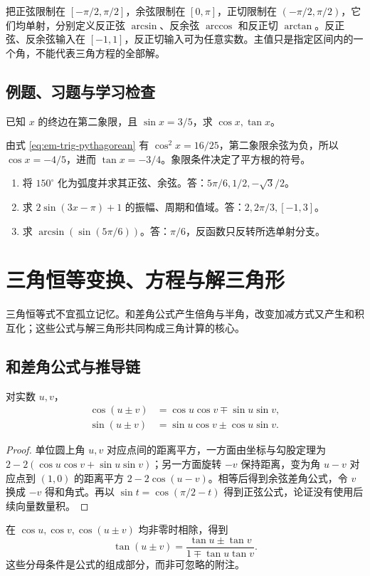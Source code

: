 \documentclass[UTF8]{ctexbook}
\begin{document}
把正弦限制在 $[-\pi/2,\pi/2]$，余弦限制在 $[0,\pi]$，正切限制在 $(-\pi/2,\pi/2)$，它们均单射，分别定义反正弦 $\arcsin$、反余弦 $\arccos$ 和反正切 $\arctan$。反正弦、反余弦输入在 $[-1,1]$，反正切输入可为任意实数。主值只是指定区间内的一个角，不能代表三角方程的全部解。

\section{例题、习题与学习检查}
\begin{example}
已知 $x$ 的终边在第二象限，且 $\sin x=3/5$，求 $\cos x,\tan x$。
\end{example}
\begin{solve}
由式 \eqref{eq:em-trig-pythagorean} 有 $\cos^2x=16/25$，第二象限余弦为负，所以 $\cos x=-4/5$，进而 $\tan x=-3/4$。象限条件决定了平方根的符号。
\end{solve}
\begin{enumerate}
\item 将 $150^\circ$ 化为弧度并求其正弦、余弦。答：$5\pi/6,1/2,-\sqrt3/2$。
\item 求 $2\sin(3x-\pi)+1$ 的振幅、周期和值域。答：$2,2\pi/3,[-1,3]$。
\item 求 $\arcsin(\sin(5\pi/6))$。答：$\pi/6$，反函数只反转所选单射分支。
\end{enumerate}

\chapter{三角恒等变换、方程与解三角形}
\label{chap:em-triangle-solving}
三角恒等式不宜孤立记忆。和差角公式产生倍角与半角，改变加减方式又产生和积互化；这些公式与解三角形共同构成三角计算的核心。

\section{和差角公式与推导链}
\begin{theorem}[和差角公式]
对实数 $u,v$，
\begin{align}
 \cos(u\pm v)&=\cos u\cos v\mp\sin u\sin v,\label{eq:em-cos-add}\\
 \sin(u\pm v)&=\sin u\cos v\pm\cos u\sin v.\label{eq:em-sin-add}
\end{align}
\end{theorem}
\begin{proof}
单位圆上角 $u,v$ 对应点间的距离平方，一方面由坐标与勾股定理为 $2-2(\cos u\cos v+\sin u\sin v)$；另一方面旋转 $-v$ 保持距离，变为角 $u-v$ 对应点到 $(1,0)$ 的距离平方 $2-2\cos(u-v)$。相等后得到余弦差角公式，令 $v$ 换成 $-v$ 得和角式。再以 $\sin t=\cos(\pi/2-t)$ 得到正弦公式，论证没有使用后续向量数量积。
\end{proof}
在 $\cos u,\cos v,\cos(u\pm v)$ 均非零时相除，得到
\[
 \tan(u\pm v)=\frac{\tan u\pm\tan v}{1\mp\tan u\tan v}.
\]
这些分母条件是公式的组成部分，而非可忽略的附注。
\end{document}
